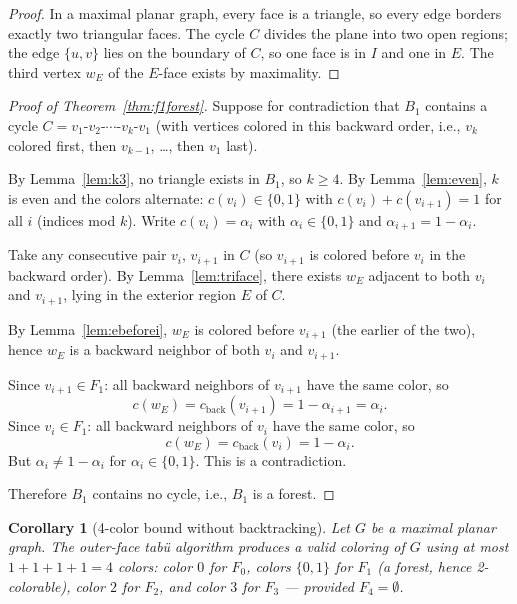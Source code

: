 \documentclass[12pt,letterpaper]{article}
\theoremstyle{plain}
\newtheorem{corollary}[theorem]{Corollary}
\theoremstyle{definition}
\theoremstyle{remark}
\begin{document}
\begin{proof}
In a maximal planar graph, every face is a triangle, so every edge borders
exactly two triangular faces. The cycle $C$ divides the plane into two open
regions; the edge $\{u,v\}$ lies on the boundary of $C$, so one face is in $I$
and one in $E$. The third vertex $w_E$ of the $E$-face exists by maximality.
\end{proof}

\begin{proof}[Proof of Theorem~\ref{thm:f1forest}]
Suppose for contradiction that $B_1$ contains a cycle
$C = v_1\text{-}v_2\text{-}\cdots\text{-}v_k\text{-}v_1$ (with vertices
colored in this backward order, i.e., $v_k$ colored first, then $v_{k-1}$,
\ldots, then $v_1$ last).

By Lemma~\ref{lem:k3}, no triangle exists in $B_1$, so $k \geq 4$. By
Lemma~\ref{lem:even}, $k$ is even and the colors alternate:
$c(v_i) \in \{0,1\}$ with $c(v_i) + c(v_{i+1}) = 1$ for all $i$ (indices
mod $k$). Write $c(v_i) = \alpha_i$ with $\alpha_i \in \{0,1\}$ and
$\alpha_{i+1} = 1 - \alpha_i$.

Take any consecutive pair $v_i$, $v_{i+1}$ in $C$ (so $v_{i+1}$ is colored
before $v_i$ in the backward order). By Lemma~\ref{lem:triface}, there exists
$w_E$ adjacent to both $v_i$ and $v_{i+1}$, lying in the exterior region $E$
of $C$.

By Lemma~\ref{lem:ebeforei}, $w_E$ is colored before $v_{i+1}$ (the earlier
of the two), hence $w_E$ is a backward neighbor of both $v_i$ and $v_{i+1}$.

Since $v_{i+1} \in F_1$: all backward neighbors of $v_{i+1}$ have the same
color, so
\[
    c(w_E) = c_{\mathrm{back}}(v_{i+1}) = 1 - \alpha_{i+1} = \alpha_i.
\]
Since $v_i \in F_1$: all backward neighbors of $v_i$ have the same color, so
\[
    c(w_E) = c_{\mathrm{back}}(v_i) = 1 - \alpha_i.
\]
But $\alpha_i \neq 1 - \alpha_i$ for $\alpha_i \in \{0,1\}$. This is a
contradiction.

Therefore $B_1$ contains no cycle, i.e., $B_1$ is a forest.
\end{proof}

\begin{corollary}[4-color bound without backtracking]
\label{cor:4color}
Let $G$ be a maximal planar graph. The outer-face tab\"{u} algorithm produces a
valid coloring of $G$ using at most $1 + 1 + 1 + 1 = 4$ colors: color $0$ for
$F_0$, colors $\{0,1\}$ for $F_1$ (a forest, hence 2-colorable), color $2$ for
$F_2$, and color $3$ for $F_3$ — provided $F_4 = \emptyset$.
\end{corollary}
\end{document}
